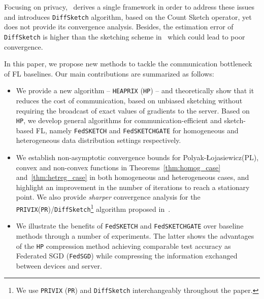 \documentclass[sigconf, anonymous, review]{acmart}
\newcommand{\pl}{Polyak-\L{}ojasiewicz}
\begin{document}
Focusing on privacy,~\citep{li2019privacy} derives a single framework in order to address these issues and introduces \texttt{DiffSketch} algorithm, based on the Count Sketch operator, yet does not provide its convergence analysis.
Besides, the estimation error of \texttt{DiffSketch} is higher than the sketching scheme in~\citep{ivkin2019communication} which could lead to poor convergence. 
 
 In this paper, we propose new methods to tackle the communication bottleneck of FL baselines.
 Our main contributions are summarized as follows:
\begin{itemize}
    \item We provide a new algorithm -- \texttt{HEAPRIX} (\texttt{HP}) -- and theoretically show that it reduces the cost of communication, based on unbiased sketching without requiring the broadcast of exact values of gradients to the server. 
    Based on \texttt{HP}, we develop general algorithms for communication-efficient and sketch-based FL, namely \texttt{FedSKETCH} and \texttt{FedSKETCHGATE} for  homogeneous and heterogeneous data distribution settings respectively.
    \item We establish non-asymptotic convergence bounds for \pl\:(PL), convex and non-convex functions in Theorems~\ref{thm:homog_case} and~\ref{thm:hetreg_case} in both homogeneous and heterogeneous cases, and highlight an improvement in the number of iterations to reach a stationary point.
We also provide \emph{sharper} convergence analysis for the \texttt{PRIVIX}(\texttt{PR})/\texttt{DiffSketch}\footnote{We use \texttt{PRIVIX} (\texttt{PR}) and \texttt{DiffSketch} \citep{li2019privacy} interchangeably throughout the paper.} algorithm proposed in~\citep{li2019privacy}.
    \item We illustrate the benefits of \texttt{FedSKETCH} and \texttt{FedSKETCHGATE} over baseline methods through a number of experiments. 
    The latter shows the advantages of the \texttt{HP} compression method achieving comparable test accuracy as Federated SGD (\texttt{FedSGD}) while compressing the information exchanged between devices and server.
\end{itemize}
\end{document}
